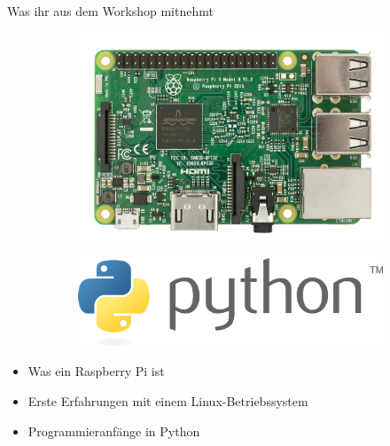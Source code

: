 \documentclass[utf8]{beamer}
\begin{document}
	\begin{frame}{Was ihr aus dem Workshop mitnehmt}
		\begin{figure}
			\begin{subfigure}{0.45\textwidth}
				\includegraphics[width=\textwidth]{img/1200px-Raspberry-Pi-3-Flat-Top.jpg}
			\end{subfigure}
			\begin{subfigure}{0.45\textwidth}
				\includegraphics[width=\textwidth]{img/Python_logo_and_wordmark200dpi.png}
			\end{subfigure}
		\end{figure}
		\begin{itemize}
			
			\item Was ein Raspberry Pi ist
			\item Erste Erfahrungen mit einem Linux-Betriebssystem
			\item Programmieranfänge in Python
		\end{itemize}
	\end{frame}
	
\end{document}
